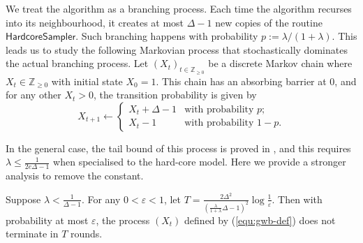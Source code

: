 \documentclass{theoretics}
\newcommand{\hcsampler}{\mathsf{HardcoreSampler}}
\begin{document}
We treat the algorithm as a branching process. 
Each time the algorithm recurses into its neighbourhood, it creates at most $\Delta-1$ new copies of the routine $\hcsampler{}$. 
Such branching happens with probability $p:=\lambda/(1+\lambda)$. 
This leads us to study the following Markovian process that stochastically dominates the actual branching process. 
Let $(X_t)_{t\in\mathbb{Z}_{\geq 0}}$ be a discrete Markov chain where $X_t\in\mathbb{Z}_{\geq 0}$ with initial state $X_0=1$. 
This chain has an absorbing barrier at $0$, and for any other $X_t>0$, the transition probability is given by
\begin{equation} \label{equ:gwb-def}
  X_{t+1}\leftarrow\begin{cases}
  X_t+\Delta-1 & \text{with probability } p; \\
  X_t-1 & \text{with probability } 1-p. 
  \end{cases}
\end{equation}

In the general case, the tail bound of this process is proved in \cite[Lemma B.12]{FGWWY22}, and this requires $\lambda\leq\frac{1}{2e\Delta-1}$ when specialised to the hard-core model. 
Here we provide a stronger analysis to remove the constant. 

\begin{lemma}\label{lem:gwb-terminate}
  Suppose $\lambda<\frac{1}{\Delta-1}$.
  For any $0<\varepsilon<1$, 
  let $T=\frac{2\Delta^2}{\left(\frac{\lambda}{1+\lambda}\Delta-1\right)^2}\log\frac{1}{\varepsilon}$. 
  Then with probability at most $\varepsilon$, the process $(X_t)$ defined by (\ref{equ:gwb-def}) does not terminate in $T$ rounds.  
\end{lemma}
\end{document}
